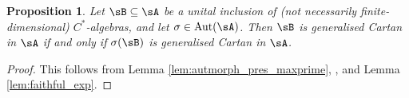 \documentclass[12pt,a4paper]{amsart}
\theoremstyle{plain}
\newtheorem{prop}[theorem]{Proposition}
\theoremstyle{definition}
\theoremstyle{remark}
\numberwithin{equation}{section}
\theoremstyle{ser}
\theoremstyle{serr}
\theoremstyle{ser}
\theoremstyle{ser}
\theoremstyle{collabquestion}
\newcommand{\C}{\mathbb{C}}
\newcommand{\<}{\langle}
\renewcommand{\>}{\rangle}
\begin{document}
\begin{prop}\label{prop:autmorph_pres_gen_cart}
Let $\sB \subseteq \sA$ be a unital inclusion of (not necessarily finite-dimensional) $C^*$-algebras, and let $\sigma \in \textrm{Aut}(\sA)$. Then $\sB$ is generalised Cartan in $\sA$ if and only if $\sigma(\sB)$ is generalised Cartan in $\sA$.
\end{prop}
\begin{proof}
    This follows from Lemma \ref{lem:autmorph_pres_maxprime}, \cite[Proposition 3.9]{BGK2026}, and Lemma \ref{lem:faithful_exp}.
\end{proof}

\end{document}
